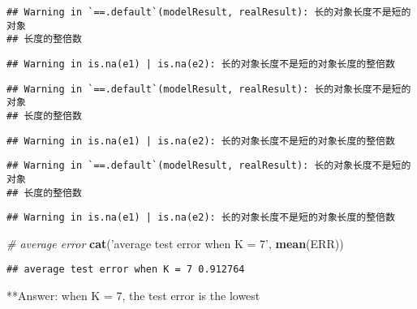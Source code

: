 \documentclass[]{article}
\newenvironment{Shaded}{\begin{snugshade}}{\end{snugshade}}
\newcommand{\CommentTok}[1]{\textcolor[rgb]{0.56,0.35,0.01}{\textit{#1}}}
\newcommand{\KeywordTok}[1]{\textcolor[rgb]{0.13,0.29,0.53}{\textbf{#1}}}
\newcommand{\NormalTok}[1]{#1}
\newcommand{\StringTok}[1]{\textcolor[rgb]{0.31,0.60,0.02}{#1}}
\begin{document}
\begin{verbatim}
## Warning in `==.default`(modelResult, realResult): 长的对象长度不是短的对象
## 长度的整倍数
\end{verbatim}

\begin{verbatim}
## Warning in is.na(e1) | is.na(e2): 长的对象长度不是短的对象长度的整倍数
\end{verbatim}

\begin{verbatim}
## Warning in `==.default`(modelResult, realResult): 长的对象长度不是短的对象
## 长度的整倍数
\end{verbatim}

\begin{verbatim}
## Warning in is.na(e1) | is.na(e2): 长的对象长度不是短的对象长度的整倍数
\end{verbatim}

\begin{verbatim}
## Warning in `==.default`(modelResult, realResult): 长的对象长度不是短的对象
## 长度的整倍数
\end{verbatim}

\begin{verbatim}
## Warning in is.na(e1) | is.na(e2): 长的对象长度不是短的对象长度的整倍数
\end{verbatim}

\begin{Shaded}
\begin{Highlighting}[]
\CommentTok{# average error}
\KeywordTok{cat}\NormalTok{(}\StringTok{'average test error when K = 7'}\NormalTok{, }\KeywordTok{mean}\NormalTok{(ERR))}
\end{Highlighting}
\end{Shaded}

\begin{verbatim}
## average test error when K = 7 0.912764
\end{verbatim}

**Answer: when K = 7, the test error is the lowest
\end{document}
